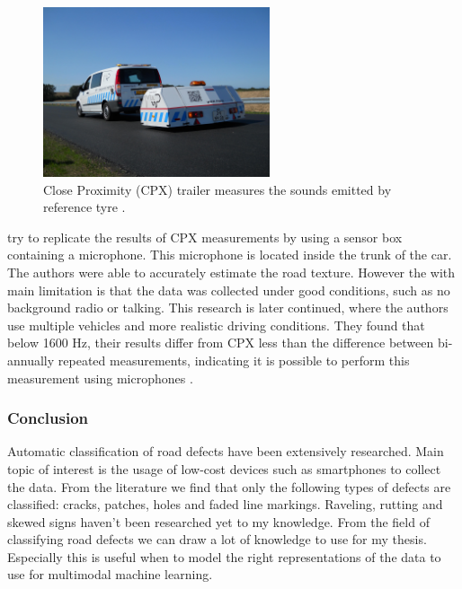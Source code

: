 \begin{figure}[ht]
\begin{center}
\includegraphics[height=5cm,keepaspectratio]{images/2_literature/cpx-trailer.jpg}
\end{center}
\caption{Close Proximity (CPX) trailer measures the sounds emitted by reference tyre \cite{MP2020}.}
\end{figure}

 try to replicate the results of CPX measurements by using a sensor box containing a microphone. This microphone is located inside the trunk of the car. The authors were able to accurately estimate the road texture. However the with main limitation is that the data was collected under good conditions, such as no background radio or talking. This research is later continued, where the authors use multiple vehicles and more realistic driving conditions. They found that below 1600 Hz, their results differ from CPX less than the difference between bi-annually repeated measurements, indicating it is possible to perform this measurement using microphones \cite{Hauwermeiren2021}.


\subsubsection{Conclusion}
Automatic classification of road defects have been extensively researched. Main topic of interest is the usage of low-cost devices such as smartphones to collect the data. From the literature we find that only the following types of defects are classified: cracks, patches, holes and faded line markings. Raveling, rutting and skewed signs haven't been researched yet to my knowledge. From the field of classifying road defects we can draw a lot of knowledge to use for my thesis. Especially this is useful when to model the right representations of the data to use for multimodal machine learning.


